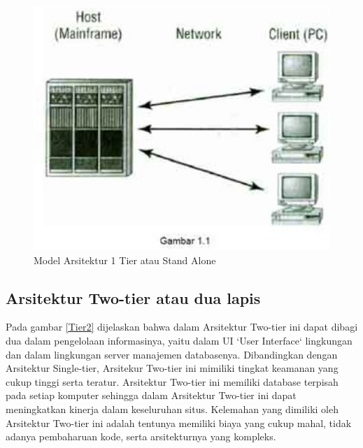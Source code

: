 \begin{figure}[ht]
    \centerline{\includegraphics[width=1\textwidth]{figures/2modelstandalone.jpg}}
    \caption{Model Arsitektur 1 Tier atau Stand Alone}
    \label{Stand}
\end{figure}

\subsection{Arsitektur Two-tier atau dua lapis}
Pada gambar \ref{Tier2} dijelaskan bahwa dalam Arsitektur Two-tier ini dapat dibagi dua dalam pengelolaan informasinya, yaitu dalam UI `User Interface` lingkungan dan dalam
lingkungan server manajemen databasenya. Dibandingkan dengan Arsitektur Single-tier, Arsitekur Two-tier ini mimiliki tingkat
keamanan yang cukup tinggi serta teratur. Arsitektur Two-tier ini memiliki database terpisah pada setiap komputer sehingga dalam
Arsitektur Two-tier ini dapat meningkatkan kinerja dalam keseluruhan situs. Kelemahan yang dimiliki oleh Arsitektur Two-tier ini
adalah tentunya memiliki biaya yang cukup mahal, tidak adanya pembaharuan kode, serta arsitekturnya yang kompleks.

